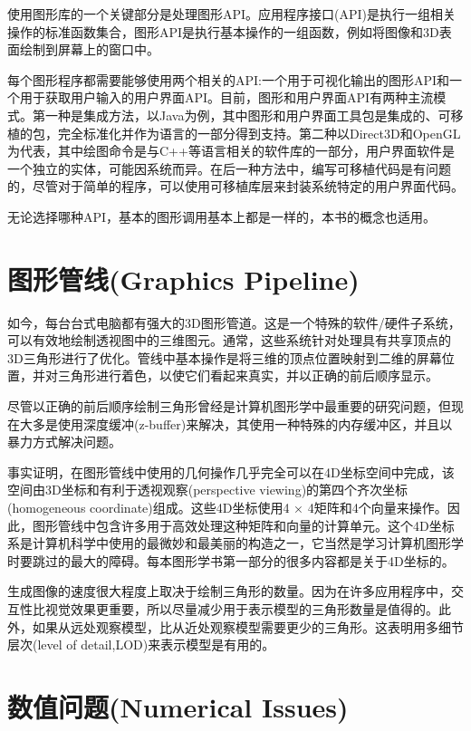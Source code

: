 使用图形库的一个关键部分是处理图形API。应用程序接口(API)是执行一组相关操作的标准函数集合，图形API是执行基本操作的一组函数，例如将图像和3D表面绘制到屏幕上的窗口中。

每个图形程序都需要能够使用两个相关的API:一个用于可视化输出的图形API和一个用于获取用户输入的用户界面API。目前，图形和用户界面API有两种主流模式。第一种是集成方法，以Java为例，其中图形和用户界面工具包是集成的、可移植的包，完全标准化并作为语言的一部分得到支持。第二种以Direct3D和OpenGL为代表，其中绘图命令是与C++等语言相关的软件库的一部分，用户界面软件是一个独立的实体，可能因系统而异。在后一种方法中，编写可移植代码是有问题的，尽管对于简单的程序，可以使用可移植库层来封装系统特定的用户界面代码。

无论选择哪种API，基本的图形调用基本上都是一样的，本书的概念也适用。

\section{图形管线(Graphics Pipeline)}

如今，每台台式电脑都有强大的3D图形管道。这是一个特殊的软件/硬件子系统，可以有效地绘制透视图中的三维图元。通常，这些系统针对处理具有共享顶点的3D三角形进行了优化。管线中基本操作是将三维的顶点位置映射到二维的屏幕位置，并对三角形进行着色，以使它们看起来真实，并以正确的前后顺序显示。

尽管以正确的前后顺序绘制三角形曾经是计算机图形学中最重要的研究问题，但现在大多是使用深度缓冲(z-buffer)来解决，其使用一种特殊的内存缓冲区，并且以暴力方式解决问题。

事实证明，在图形管线中使用的几何操作几乎完全可以在4D坐标空间中完成，该空间由3D坐标和有利于透视观察(perspective viewing)的第四个齐次坐标(homogeneous coordinate)组成。这些4D坐标使用4 × 4矩阵和4个向量来操作。因此，图形管线中包含许多用于高效处理这种矩阵和向量的计算单元。这个4D坐标系是计算机科学中使用的最微妙和最美丽的构造之一，它当然是学习计算机图形学时要跳过的最大的障碍。每本图形学书第一部分的很多内容都是关于4D坐标的。

生成图像的速度很大程度上取决于绘制三角形的数量。因为在许多应用程序中，交互性比视觉效果更重要，所以尽量减少用于表示模型的三角形数量是值得的。此外，如果从远处观察模型，比从近处观察模型需要更少的三角形。这表明用多细节层次(level of detail,LOD)来表示模型是有用的。

\section{数值问题(Numerical Issues)}

